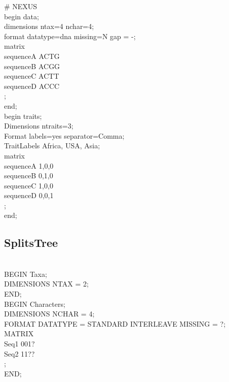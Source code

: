 \noindent \# NEXUS \\
begin data; \\
dimensions ntax=4 nchar=4; \\
format datatype=dna missing=N gap = -; \\
\noindent matrix \\
\noindent sequenceA \hspace{0.5cm} ACTG \\
sequenceB \hspace{0.5cm} ACGG \\
sequenceC \hspace{0.5cm}  ACTT \\
sequenceD \hspace{0.5cm}  ACCC \\
; \\
end; \\
\noindent begin traits; \\
Dimensions ntraits=3; \\
Format labels=yes separator=Comma; \\
TraitLabels Africa, USA, Asia; \\
matrix \\ 
\noindent sequenceA \hspace{0.5cm} 1,0,0 \\
sequenceB \hspace{0.5cm} 0,1,0 \\
sequenceC \hspace{0.5cm} 1,0,0 \\
sequenceD \hspace{0.5cm} 0,0,1 \\
; \\
end; \\

\subsection{SplitsTree}
\label{appendix:splitstree_input}

 \\
BEGIN Taxa; \\
DIMENSIONS NTAX = 2; \\
END; \\
BEGIN Characters; \\
DIMENSIONS NCHAR = 4; \\
FORMAT DATATYPE = STANDARD INTERLEAVE MISSING = ?; \\
MATRIX \\
Seq1 001? \\
Seq2 11?? \\ 
; \\ 
END;  

